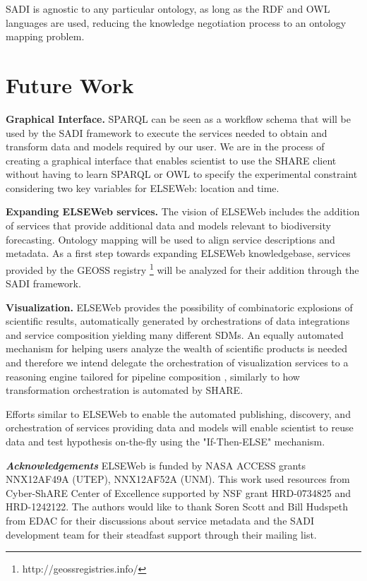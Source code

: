 \documentclass[letterpaper]{article}
\begin{document}
SADI is agnostic to any particular ontology, as long as the RDF and OWL languages are used, reducing the knowledge negotiation process to an ontology mapping problem.


\section{Future Work}
{\bf Graphical Interface.} SPARQL can be seen as a workflow schema that will be used by the SADI framework to execute the services needed to obtain and transform data and models required by our user. We are in the process of creating a graphical interface that enables scientist to use the SHARE client without having to learn SPARQL or OWL to specify the experimental constraint considering two key variables for ELSEWeb: location and time. 

{\bf Expanding ELSEWeb services.} The vision of ELSEWeb includes the addition of services that provide additional data and models relevant to biodiversity forecasting. Ontology mapping will be used to align service descriptions and metadata. As a first step towards expanding ELSEWeb knowledgebase, services provided by the GEOSS registry \footnote{http://geossregistries.info/} will be analyzed for their addition through the SADI framework.  

{\bf Visualization.} ELSEWeb provides the possibility of combinatoric explosions of scientific results, automatically generated by orchestrations of data integrations and service composition yielding many different SDMs. An equally automated mechanism for helping users analyze the wealth of scientific products is needed and therefore we intend delegate the orchestration of visualization services to a reasoning engine tailored for pipeline composition \cite{del2012capturing}, similarly to how transformation orchestration is automated by SHARE.

Efforts similar to ELSEWeb to enable the automated publishing, discovery, and orchestration of services providing data and models will enable scientist to reuse data and test hypothesis on-the-fly using the "If-Then-ELSE" mechanism.

{\em\bf Acknowledgements} ELSEWeb is funded by NASA ACCESS grants NNX12AF49A (UTEP), NNX12AF52A (UNM). This work used resources from Cyber-ShARE Center of Excellence supported by NSF grant HRD-0734825 and HRD-1242122. The authors would like to thank Soren Scott and Bill Hudspeth from EDAC for their discussions about service metadata and the SADI development team for their steadfast support through their mailing list.



%
\begin{quote}
\begin{small}


\end{small}
\end{quote}
%
%
\end{document}
